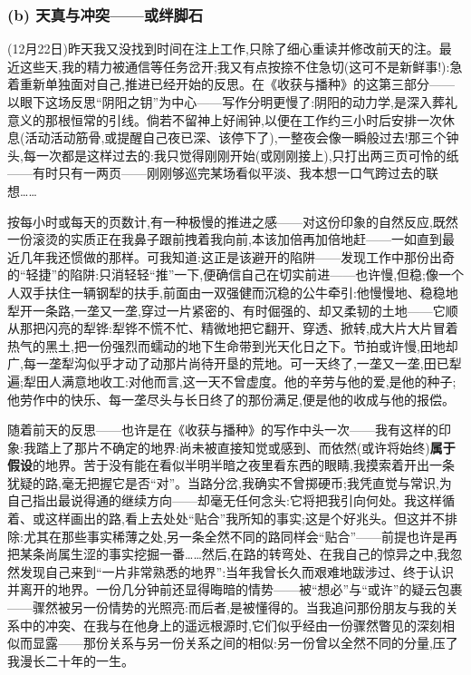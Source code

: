 \subsubsection*{(b) 天真与冲突——或绊脚石}
\label{ch18:local:h64}

\label{ch18:local:n58}

(12月22日)昨天我又没找到时间在注上工作,只除了细心重读并修改前天的注。最近这些天,我的精力被通信\dmark{}等任务岔开;我又有点按捺不住急切(这可不是新鲜事!):急着重新单独面对自己,推进已经开始的反思。在《收获与播种》的这第三部分——以眼下这场反思“阴阳之钥”为中心——写作分明更慢了:阴阳的动力学,是深入葬礼意义的那根恒常的引线。倘若不留神上好闹钟,以便在工作约三小时后安排一次休息(活动活动筋骨,或提醒自己夜已深、该停下了),一整夜会像一瞬般过去!那三个钟头,每一次都是这样过去的:我只觉得刚刚开始(或刚刚接上),只打出两三页可怜的纸——有时只有一两页——刚刚够巡完某场看似平淡、我本想一口气跨过去的联想……

按每小时或每天的页数计,有一种极慢的推进之感——对这份印象的自然反应,既然一份滚烫的实质正在我鼻子跟前拽着我向前,本该加倍再加倍地赶——一如直到最近几年我还惯做的那样。可我知道:这正是该避开的陷阱——发现工作中那份出奇的“轻捷”的陷阱:只消轻轻“推”一下,便确信自己在切实前进——也许慢,但稳;像一个人双手扶住一辆钢犁的扶手,前面由一双强健而沉稳的公牛牵引:他慢慢地、稳稳地犁开一条路,一垄又一垄,穿过一片紧密的、有时倔强的、却又柔韧的土地——它顺从那把闪亮的犁铧:犁铧不慌不忙、精微地把它翻开、穿透、掀转,成大片大片冒着热气的黑土,把一份强烈而蠕动的地下生命带到光天化日之下。节拍或许慢,田地却广,每一垄犁沟似乎才动了动那片尚待开垦的荒地。可一天终了,一垄又一垄,田已犁遍;犁田人满意地收工:对他而言,这一天不曾虚度。他的辛劳与他的爱,是他的种子;他劳作中的快乐、每一垄尽头与长日终了的那份满足,便是他的收成与他的报偿。

\asterisms

\dmark{}随着前天的反思——也许是在《收获与播种》的写作中头一次——我有这样的印象:我踏上了那片不确定的地界:尚未被直接知觉或感到、而依然(或许将始终)\textbf{属于假设}的地界。苦于没有能在看似半明半暗之夜里看东西的眼睛,我摸索着开出一条犹疑的路,毫无把握它是否“对”。当路分岔,我确实不曾掷硬币;我凭直觉与常识,为自己指出最说得通的继续方向——却毫无任何念头:它将把我引向何处。我这样循着、或这样画出的路,看上去处处“贴合”我所知的事实;这是个好兆头。但这并不排除:尤其在那些事实稀薄之处,另一条全然不同的路同样会“贴合”——前提也许是再把某条尚属生涩的事实挖掘一番……然后,在路的转弯处、在我自己的惊异之中,我忽然发现自己来到“一片非常熟悉的地界”:当年我曾长久而艰难地跋涉过、终于认识并离开的地界。一份几分钟前还显得晦暗的情势——被“想必”与“或许”的疑云包裹——骤然被另一份情势的光照亮:而后者,是被懂得的。当我追问那份朋友与我的关系中的冲突、在我与在他身上的遥远根源时,它们似乎经由一份骤然瞥见的深刻相似而显露——那份关系与另一份关系之间的相似:另一份曾以全然不同的分量,压了我漫长二十年的一生。


